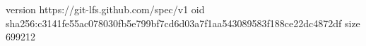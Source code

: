 version https://git-lfs.github.com/spec/v1
oid sha256:c3141fe55ac078030fb5e799bf7cd6d03a7f1aa543089583f188ce22dc4872df
size 699212

